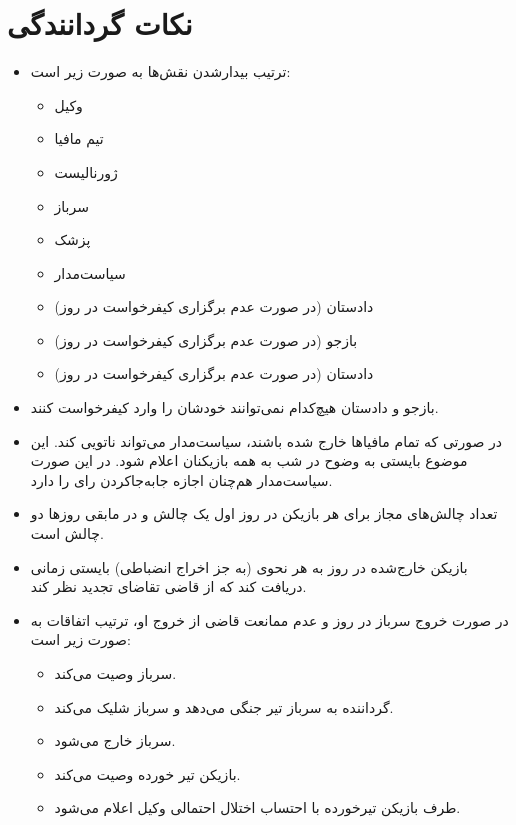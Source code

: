 \documentclass[12pt]{extarticle}
\begin{document}
\section*{نکات گردانندگی}
\begin{itemize}
	\item ترتیب بیدارشدن نقش‌ها به صورت زیر است:
	      \begin{itemize}
		      \item وکیل
		      \item تیم مافیا
		      \item ژورنالیست
		      \item سرباز
		      \item پزشک
		      \item سیاست‌مدار
		      \item دادستان (در صورت عدم برگزاری کیفرخواست در روز)
		      \item بازجو (در صورت عدم برگزاری کیفرخواست در روز)
		      \item دادستان (در صورت عدم برگزاری کیفرخواست در روز)
	      \end{itemize}
	\item بازجو و دادستان هیچ‌کدام نمی‌توانند خودشان را وارد کیفرخواست کنند.
	\item در صورتی که تمام مافیاها خارج شده باشند، سیاست‌مدار می‌تواند ناتویی کند. این موضوع بایستی به وضوح در شب به همه بازیکنان اعلام شود. در این صورت سیاست‌مدار هم‌چنان اجازه جابه‌جاکردن رای را دارد.
	\item تعداد چالش‌های مجاز برای هر بازیکن در روز اول یک چالش و در مابقی روزها دو چالش است.
	\item بازیکن خارج‌شده در روز به هر نحوی (به جز اخراج انضباطی) بایستی زمانی دریافت کند که از قاضی تقاضای تجدید نظر کند.
	\item در صورت خروج سرباز در روز و عدم ممانعت قاضی از خروج او، ترتیب اتفاقات به صورت زیر است:
	      \begin{itemize}
		      \item سرباز وصیت می‌کند.
		      \item گرداننده به سرباز تیر جنگی می‌دهد و سرباز شلیک می‌کند.
		      \item سرباز خارج می‌شود.
		      \item بازیکن تیر خورده وصیت می‌کند.
		      \item طرف بازیکن تیرخورده با احتساب اختلال احتمالی وکیل اعلام می‌شود.
	      \end{itemize}
\end{itemize}
\end{document}
